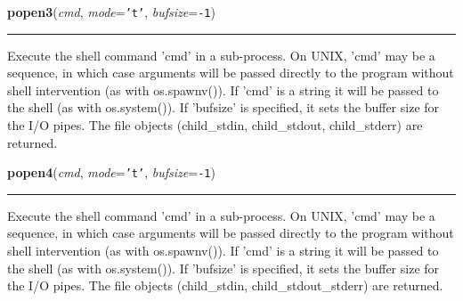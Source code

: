 \hspace{.8\funcindent}\begin{boxedminipage}{\funcwidth}

    \raggedright \textbf{popen3}(\textit{cmd}, \textit{mode}={\tt \texttt{'}\texttt{t}\texttt{'}}, \textit{bufsize}={\tt -1})

    \vspace{-1.5ex}

    \rule{\textwidth}{0.5\fboxrule}
\setlength{\parskip}{2ex}
    Execute the shell command 'cmd' in a sub-process.  On UNIX, 'cmd' may 
    be a sequence, in which case arguments will be passed directly to the 
    program without shell intervention (as with os.spawnv()).  If 'cmd' is 
    a string it will be passed to the shell (as with os.system()). If 
    'bufsize' is specified, it sets the buffer size for the I/O pipes.  The
    file objects (child\_stdin, child\_stdout, child\_stderr) are returned.

\setlength{\parskip}{1ex}
    \end{boxedminipage}

    \label{os:popen4}

    \vspace{0.5ex}

\hspace{.8\funcindent}\begin{boxedminipage}{\funcwidth}

    \raggedright \textbf{popen4}(\textit{cmd}, \textit{mode}={\tt \texttt{'}\texttt{t}\texttt{'}}, \textit{bufsize}={\tt -1})

    \vspace{-1.5ex}

    \rule{\textwidth}{0.5\fboxrule}
\setlength{\parskip}{2ex}
    Execute the shell command 'cmd' in a sub-process.  On UNIX, 'cmd' may 
    be a sequence, in which case arguments will be passed directly to the 
    program without shell intervention (as with os.spawnv()).  If 'cmd' is 
    a string it will be passed to the shell (as with os.system()). If 
    'bufsize' is specified, it sets the buffer size for the I/O pipes.  The
    file objects (child\_stdin, child\_stdout\_stderr) are returned.

\setlength{\parskip}{1ex}
    \end{boxedminipage}

    \label{os:putenv}

    \vspace{0.5ex}

